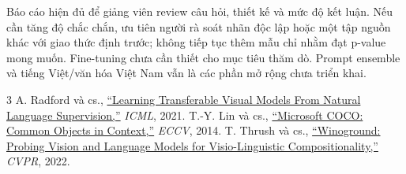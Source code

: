 \documentclass[11pt,a4paper]{article}
\begin{document}
Báo cáo hiện đủ để giảng viên review câu hỏi, thiết kế và mức độ kết luận. Nếu cần tăng độ chắc chắn, ưu tiên người rà soát nhãn độc lập hoặc một tập nguồn khác với giao thức định trước; không tiếp tục thêm mẫu chỉ nhằm đạt p-value mong muốn. Fine-tuning chưa cần thiết cho mục tiêu thăm dò. Prompt ensemble và tiếng Việt/văn hóa Việt Nam vẫn là các phần mở rộng chưa triển khai.

\begingroup\small
\begin{thebibliography}{3}
\setlength{\itemsep}{0pt}\setlength{\parskip}{0pt}
 A. Radford và cs., \href{https://proceedings.mlr.press/v139/radford21a.html}{``Learning Transferable Visual Models From Natural Language Supervision,''} \emph{ICML}, 2021.
 T.-Y. Lin và cs., \href{https://arxiv.org/abs/1405.0312}{``Microsoft COCO: Common Objects in Context,''} \emph{ECCV}, 2014.
 T. Thrush và cs., \href{https://arxiv.org/abs/2204.03162}{``Winoground: Probing Vision and Language Models for Visio-Linguistic Compositionality,''} \emph{CVPR}, 2022.
\end{thebibliography}\endgroup
\end{document}

